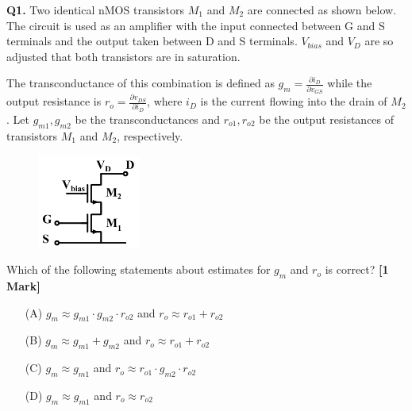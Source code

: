 \documentclass[11pt]{article}
\newcommand{\questiona}[2]{
    \noindent\textbf{Q#2.} #1 \hfill \textbf{[1 Mark]}
}
\begin{document}
\questiona{Two identical nMOS transistors $M_1$ and $M_2$ are connected as shown below. The circuit is used as an amplifier with the input connected between G and S terminals and the output taken between D and S terminals. $V_{bias}$ and $V_D$ are so adjusted that both transistors are in saturation.
\vspace{0.2cm}

The transconductance of this combination is defined as $g_m = \frac{\partial i_D}{\partial v_{GS}}$ while the output resistance is $r_o = \frac{\partial v_{DS}}{\partial i_D}$, where $i_D$ is the current flowing into the drain of $M_2$. Let $g_{m1}, g_{m2}$ be the transconductances and $r_{o1}, r_{o2}$ be the output resistances of transistors $M_1$ and $M_2$, respectively.
\begin{center}
\begin{figure}[h]
    \centering
	\includegraphics[width=0.3\textwidth]{figures/1.png}
\end{figure}
\end{center}

Which of the following statements about estimates for $g_m$ and $r_o$ is correct?}{1}
\begin{enumerate}
    \item[(A)] $g_m \approx g_{m1} \cdot g_{m2} \cdot r_{o2}$ and $r_o \approx r_{o1} + r_{o2}$
    \item[(B)] $g_m \approx g_{m1} + g_{m2}$ and $r_o \approx r_{o1} + r_{o2}$
    \item[(C)] $g_m \approx g_{m1}$ and $r_o \approx r_{o1} \cdot g_{m2} \cdot r_{o2}$
    \item[(D)] $g_m \approx g_{m1}$ and $r_o \approx r_{o2}$
\end{enumerate}

\vspace{0.5cm}
\end{document}

